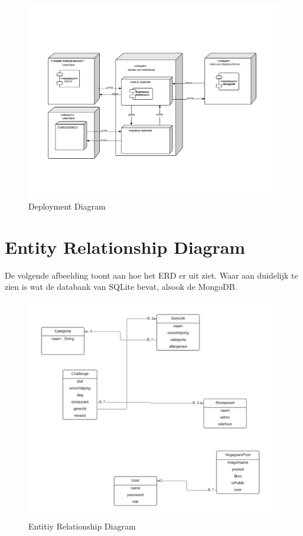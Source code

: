 \begin{figure}[H]
	\centering
	\includegraphics[width=15cm]{img/DeploymentDiagram.png}
	\caption{Deployment Diagram}
\end{figure}

\section{Entity Relationship Diagram}

De volgende afbeelding toont aan hoe het ERD er uit ziet. Waar aan duidelijk te zien is wat de databank van SQLite bevat, alsook de MongoDB.

\begin{figure}[H]
	\centering
	\includegraphics[width=15cm]{img/erd_mongo.png}
	\caption{Entitiy Relationship Diagram}
\end{figure}

